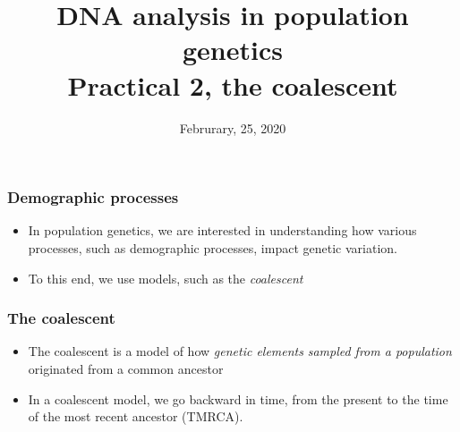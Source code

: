 \documentclass[8pt]{beamer}
\title{DNA analysis in population genetics\\
Practical 2, the coalescent}
\date{Februrary, 25, 2020}
\author{
    \texorpdfstring{
        \begin{columns}
              \column{.45\linewidth}
              \centering
              Chedly Kastally\\
              \href{mailto:chedly.kastally@oulu.fi}{chedly.kastally@oulu.fi}
              \column{.45\linewidth}
              \centering
              Tanja Pyh{\"a}j{\"a}rvi\\
              \href{mailto:tanja.pyhajarvi@oulu.fi}{tanja.pyhajarvi@oulu.fi}
        \end{columns}
    }
    {Kastally, Chedly \and Tanja Pyh{\"a}j{\"a}rvi}
}
\begin{document}
\begin{frame}

\maketitle

\end{frame}

{

}

\begin{frame}
    \frametitle{Demographic processes}

    \large

    \begin{itemize}
    
        \item<1-> In population genetics, we are interested in understanding how
            various processes, such as demographic processes, impact genetic
            variation.

        \item<2-> To this end, we use models, such as the \textit{coalescent}

    \end{itemize}

\end{frame}


{

}

\begin{frame}
    \frametitle{The coalescent}

    \large

    \begin{itemize}
    
        \item<1-> The coalescent is a model of how \textit{genetic elements} \textit{sampled from a population} originated from a common ancestor

        \item<2-> In a coalescent model, we go backward in time, from
            the present to the time of the most recent ancestor (TMRCA).

    \end{itemize}

\end{frame}
\end{document}
